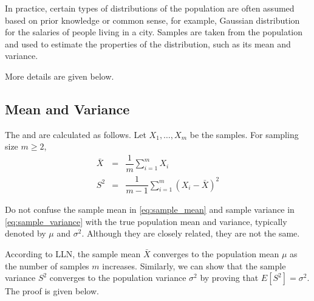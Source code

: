 In practice, certain types of distributions of the population are often assumed based on prior knowledge or common sense, for example, Gaussian distribution for the salaries of people living in a city. Samples are taken from the population and used to estimate the properties of the distribution, such as its mean and variance.

More details are given below.

\subsection{Mean and Variance}

The  and  are calculated as follows. Let $X_1, \ldots, X_m$ be the samples. For sampling size $m\geq 2$,
\begin{eqnarray}
	\bar{X} &=& \dfrac{1}{m}\sum_{i=1}^{m}X_i \label{eq:sample_mean} \\
	S^2 &=& \dfrac{1}{m-1}\sum_{i=1}^{m}\left(X_i - \bar{X}\right)^2 \label{eq:sample_variance}
\end{eqnarray}

Do not confuse the sample mean in \eqref{eq:sample_mean} and sample variance in \eqref{eq:sample_variance} with the true population mean and variance, typically denoted by $\mu$ and $\sigma^2$. Although they are closely related, they are not the same.

According to LLN, the sample mean $\bar{X}$ converges to the population mean $\mu$ as the number of samples $m$ increases. Similarly, we can show that the sample variance $S^2$ converges to the population variance $\sigma^2$ by proving that $E[S^2] = \sigma^2$. The proof is given below.

